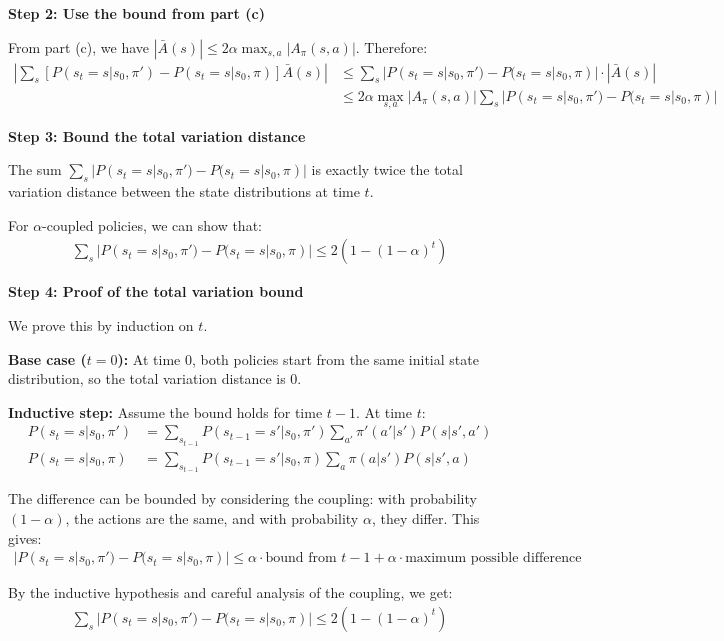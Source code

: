 \textbf{Step 2: Use the bound from part (c)}

From part (c), we have $|\bar{A}(s)| \le 2\alpha \max_{s, a}|A_{\pi}(s,a)|$. Therefore:
\begin{align}
\left| \sum_{s} [P(s_t = s | s_0, \pi') - P(s_t = s | s_0, \pi)] \bar{A}(s) \right| &\le \sum_{s} |P(s_t = s | s_0, \pi') - P(s_t = s | s_0, \pi)| \cdot |\bar{A}(s)| \\
&\le 2\alpha \max_{s, a}|A_{\pi}(s,a)| \sum_{s} |P(s_t = s | s_0, \pi') - P(s_t = s | s_0, \pi)|
\end{align}

\textbf{Step 3: Bound the total variation distance}

The sum $\sum_{s} |P(s_t = s | s_0, \pi') - P(s_t = s | s_0, \pi)|$ is exactly twice the total variation distance between the state distributions at time $t$.

For $\alpha$-coupled policies, we can show that:
\begin{align}
\sum_{s} |P(s_t = s | s_0, \pi') - P(s_t = s | s_0, \pi)| \le 2(1-(1-\alpha)^t)
\end{align}

\textbf{Step 4: Proof of the total variation bound}

We prove this by induction on $t$.

\textbf{Base case ($t = 0$):} At time 0, both policies start from the same initial state distribution, so the total variation distance is 0.

\textbf{Inductive step:} Assume the bound holds for time $t-1$. At time $t$:
\begin{align}
P(s_t = s | s_0, \pi') &= \sum_{s_{t-1}} P(s_{t-1} = s' | s_0, \pi') \sum_{a'} \pi'(a'|s') P(s|s',a') \\
P(s_t = s | s_0, \pi) &= \sum_{s_{t-1}} P(s_{t-1} = s' | s_0, \pi) \sum_{a} \pi(a|s') P(s|s',a)
\end{align}

The difference can be bounded by considering the coupling: with probability $(1-\alpha)$, the actions are the same, and with probability $\alpha$, they differ. This gives:
\begin{align}
|P(s_t = s | s_0, \pi') - P(s_t = s | s_0, \pi)| \le \alpha \cdot \text{bound from } t-1 + \alpha \cdot \text{maximum possible difference}
\end{align}

By the inductive hypothesis and careful analysis of the coupling, we get:
\begin{align}
\sum_{s} |P(s_t = s | s_0, \pi') - P(s_t = s | s_0, \pi)| \le 2(1-(1-\alpha)^t)
\end{align}

